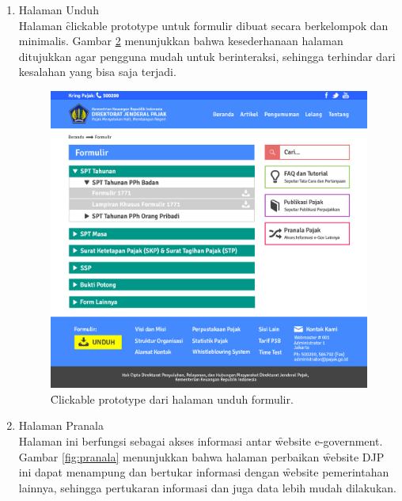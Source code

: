 \begin{enumerate}
\begin{figure}
			{pics/login.jpg}
			\caption{\f{Clickable prototype} dari halaman login e-Filling.}
			\label{fig:login}
		\end{figure}
	\item Halaman Unduh \\
	Halaman \f{clickable prototype} untuk formulir dibuat secara berkelompok dan minimalis. Gambar \ref{fig:formulir} menunjukkan bahwa kesederhanaan halaman ditujukkan agar pengguna mudah untuk berinteraksi, sehingga terhindar dari kesalahan yang bisa saja terjadi.
		\begin{figure}
			\centering
			\includegraphics[width=\textwidth]
			{pics/formulir.jpg}
			\caption{\f{Clickable prototype} dari halaman unduh formulir.}
			\label{fig:formulir}
		\end{figure}
	\item Halaman Pranala \\
	Halaman ini berfungsi sebagai akses informasi antar \f{website e-government}. Gambar \ref{fig:pranala} menunjukkan bahwa halaman perbaikan \f{website} DJP ini dapat menampung dan bertukar informasi dengan \f{website} pemerintahan lainnya, sehingga pertukaran informasi dan juga data lebih mudah dilakukan.
		\begin{figure}
			\centering

\end{figure}
\end{enumerate}
